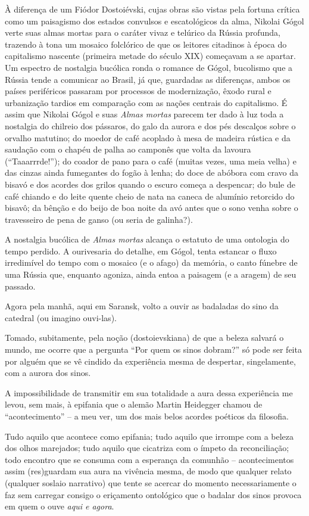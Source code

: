 À diferença de um Fiódor Dostoiévski, cujas obras são vistas pela
fortuna crítica como um paisagismo dos estados convulsos e escatológicos
da alma, Nikolai Gógol verte suas almas mortas para o caráter vivaz e
telúrico da Rússia profunda, trazendo à tona um mosaico folclórico de
que os leitores citadinos à época do capitalismo nascente (primeira
metade do século XIX) começavam a se apartar. Um espectro de nostalgia
bucólica ronda o romance de Gógol, bucolismo que a Rússia tende a
comunicar ao Brasil, já que, guardadas as diferenças, ambos os países
periféricos passaram por processos de modernização, êxodo rural e
urbanização tardios em comparação com as nações centrais do capitalismo.
É assim que Nikolai Gógol e suas \emph{Almas mortas} parecem ter dado à
luz toda a nostalgia do chilreio dos pássaros, do galo da aurora e dos
pés descalços sobre o orvalho matutino; do moedor de café acoplado à
mesa de madeira rústica e da saudação com o chapéu de palha ao camponês
que volta da lavoura (``Taaarrrde!''); do coador de pano para o café
(muitas vezes, uma meia velha) e das cinzas ainda fumegantes do fogão à
lenha; do doce de abóbora com cravo da bisavó e dos acordes dos grilos
quando o escuro começa a despencar; do bule de café chiando e do leite
quente cheio de nata na caneca de alumínio retorcido do bisavô; da
bênção e do beijo de boa noite da avó antes que o sono venha sobre o
travesseiro de pena de ganso (ou seria de galinha?).

A nostalgia bucólica de \emph{Almas mortas} alcança o estatuto de uma
ontologia do tempo perdido. A ourivesaria do detalhe, em Gógol, tenta
estancar o fluxo irredimível do tempo com o mosaico (e o afago) da
memória, o canto fúnebre de uma Rússia que, enquanto agoniza, ainda
entoa a paisagem (e a aragem) de seu passado.

Agora pela manhã, aqui em Saransk, volto a ouvir as badaladas do sino da
catedral (ou imagino ouvi-las).

Tomado, subitamente, pela noção (dostoievskiana) de que a beleza salvará
o mundo, me ocorre que a pergunta ``Por quem os sinos dobram?'' só pode
ser feita por alguém que se vê cindido da experiência mesma de
despertar, singelamente, com a aurora dos sinos.

A impossibilidade de transmitir em sua totalidade a aura dessa
experiência me levou, sem mais, à epifania que o alemão Martin Heidegger
chamou de ``acontecimento'' -- a meu ver, um dos mais belos acordes
poéticos da filosofia.

Tudo aquilo que acontece como epifania; tudo aquilo que irrompe com a
beleza dos olhos marejados; tudo aquilo que cicatriza com o ímpeto da
reconciliação; todo encontro que se consuma com a esperança da comunhão
-- acontecimentos assim (res)guardam sua aura na vivência mesma, de modo
que qualquer relato (qualquer soslaio narrativo) que tente se acercar do
momento necessariamente o faz sem carregar consigo o eriçamento
ontológico que o badalar dos sinos provoca em quem o ouve \emph{aqui e
agora}.

